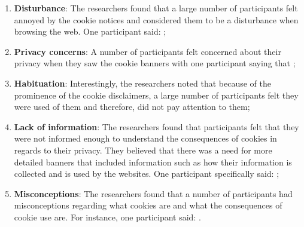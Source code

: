\documentclass[../main.tex]{subfiles}
\begin{document}
\begin{enumerate}
    \item \textbf{Disturbance}: The researchers found that a large number of participants felt annoyed by the cookie notices and considered them to be a disturbance when browsing the web. One participant said: ;
    \item \textbf{Privacy concerns}: A number of participants felt concerned about their privacy when they saw the cookie banners with one participant saying that ;
    \item \textbf{Habituation}: Interestingly, the researchers noted that because of the prominence of the cookie disclaimers, a large number of participants felt they were used of them and therefore, did not pay attention to them;
    \item \textbf{Lack of information}: The researchers found that participants felt that they were not informed enough to understand the consequences of cookies in regards to their privacy. They believed that there was a need for more detailed banners that included information such as how their information is collected and is used by the websites. One participant specifically said:  ;
    \item \textbf{Misconceptions}: The researchers found that a number of participants had misconceptions regarding what cookies are and what the consequences of cookie use are. For instance, one participant said: .
\end{enumerate}
\end{document}
